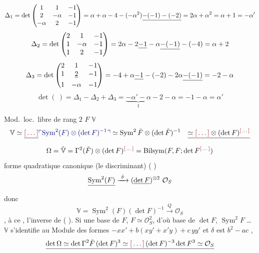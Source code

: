 \documentclass[11pt,a4paper]{article}
\begin{document}
\[
\Delta_1 = \det\begin{pmatrix} 1 & 1 & -1 \\ 2 & -\alpha & -1 \\ -\alpha & 2 & -1 \end{pmatrix} = \alpha + \alpha - 4 - (-\alpha^2) \struck{-(-1) - (-2)}
= 2\alpha + \alpha^2 = \alpha + 1 = -\alpha'
\]
\[
\Delta_2 = \det\begin{pmatrix} 2 & 1 & -1 \\ 1 & -\alpha & -1 \\ 1 & 2 & -1 \end{pmatrix} = 2\alpha - 2 \struck{-1} - \alpha \struck{-(-1)} - (-4) = \alpha + 2
\]
\[
\Delta_3 = \det\begin{pmatrix} 2 & 1 & -1 \\ 1 & \struck{2} & -1 \\ 1 & -\alpha & -1 \end{pmatrix} = -4 + \alpha \struck{-1} - (-2) - 2\alpha \struck{-(-1)} = -2 - \alpha
\]
\[
\det(\ ) = \Delta_1 - \Delta_2 + \Delta_3 = \underbrace{-\alpha' - \alpha}_{1} - 2 - \alpha = -1 - \alpha = \alpha'
\]

Mod.\ loc.\ libre de rang $2$ \quad $F$ \quad $\mathbb{V}$
\[
\mathbb{V} \simeq \struck{\ill{}} \add{\operatorname{Sym}^2(F) \otimes (\det F)^{-1}} \simeq \operatorname{Sym}^2 \check F \otimes (\det \check F)^{-1} \quad \struck{\simeq \ill{} \otimes (\det F)^{\ill{}}}
\]
\[
\Omega = \check{\mathbb{V}} = \Gamma^2(\check F) \otimes (\det F)^{\ill{}} = \operatorname{Bilsym}(F, F; \det F^{\ill{}})
\]
\ill{} \ill{} forme quadratique canonique (le discriminant) ( \ill{})
\[
\struck{\operatorname{Sym}^2(F)} \xrightarrow{\ \delta\ } (\struck{\det F})^{\otimes 2}\ \mathcal{O}_S
\]
donc
\[
\mathbb{V} = \operatorname{Sym}^2(F)(\det F)^{-1} \xrightarrow{\ Q\ } \mathcal{O}_S
\]
\ill{} \ill{}, à ce , l'inverse de \ill{} ( \ill{}). Si \ill{} une base de $F$, $F \simeq \mathcal{O}_S^2$, d'où base de $\det F$, $\operatorname{Sym}^2 F$ \ldots\   $\mathbb{V}$ s'identifie au Module des formes $-x x' + b(xy' + x'y) + c\,yy'$ et $\delta$ est  \struck{\ill{}} $b^2 - ac$ \ill{} \ill{}, \struck{\ill{}} \ill{} \ill{} \ill{} \ill{} \struck{\ill{}}
\[
\struck{\det\Omega \simeq \det\Gamma^2\check F\,(\det F)^{3} \simeq \ill{}\,(\det F)^{-3} \det F^{3} \simeq \mathcal{O}_S}
\]
\end{document}
